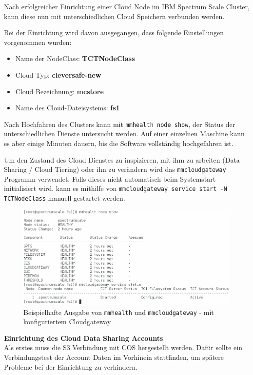 Nach erfolgreicher Einrichtung einer Cloud Node im IBM Spectrum Scale Cluster, kann diese nun mit unterschiedlichen Cloud Speichern verbunden werden.

Bei der Einrichtung wird davon ausgegangen, dass folgende Einstellungen vorgenommen wurden:
\begin{itemize}
	\item Name der NodeClass: \textbf{TCTNodeClass}
	\item Cloud Typ: \textbf{cleversafe-new}
	\item Cloud Bezeichnung: \textbf{mcstore}
	\item Name des Cloud-Dateisystems: \textbf{fs1}
\end{itemize}

Nach Hochfahren des Clusters kann mit \lstinline|mmhealth node show|, der Status der unterschiedlichen Dienste untersucht werden. Auf einer einzelnen Maschine kann es aber einige Minuten dauern, bis die Software vollständig hochgefahren ist.

Um den Zustand des Cloud Dienstes zu inspizieren, mit ihm zu arbeiten (Data Sharing / Cloud Tiering) oder ihn zu verändern wird das \lstinline|mmcloudgateway| Programm verwendet. Falls dieses nicht automatisch beim Systemstart initialisiert wird, kann es mithilfe von \lstinline|mmcloudgateway service start -N TCTNodeClass| manuell gestartet werden.

\begin{figure}[hbt]
	\centering
	\includegraphics[scale=0.5]{images/scale-status}
	\caption{Beispielhafte Ausgabe von \lstinline|mmhealth| und \lstinline|mmcloudgateway| - mit konfiguriertem Cloudgateway}
	\label{fig:saclestatus}
\end{figure}


\textbf{Einrichtung des Cloud Data Sharing Accounts}\\
Als erstes muss die S3 Verbindung mit \ac{COS} hergestellt werden. Dafür sollte ein Verbindungstest der Account Daten im Vorhinein stattfinden, um spätere Probleme bei der Einrichtung zu verhindern.

